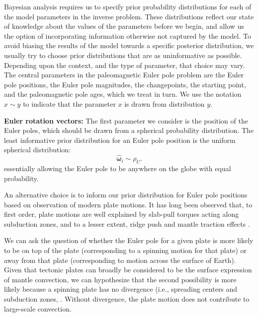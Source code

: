 \documentclass[]{agujournal2019}
\begin{document}
Bayesian analysis requires us to specify prior probability distributions for each of the model parameters in the inverse problem. These distributions reflect our state of knowledge about the values of the parameters before we begin, and allow us the option of incorporating information otherwise not captured by the model. To avoid biasing the results of the model towards a specific posterior distribution, we usually try to choose prior distributions that are as uninformative as possible. Depending upon the context, and the type of parameter, that choice may vary. The central parameters in the paleomagnetic Euler pole problem are the Euler pole positions, the Euler pole magnitudes, the changepoints, the starting point, and the paleomagnetic pole ages, which we treat in turn. We use the notation $x \sim y$ to indicate that the parameter $x$ is drawn from distribution $y$.

\textbf{Euler rotation vectors:} 
The first parameter we consider is the position of the Euler poles, which should be drawn from a spherical probability distribution. The least informative prior distribution for an Euler pole position is the uniform spherical distribution:
\begin{equation}
\hat{\mathbf{\omega}}_i \sim \rho_U.
\end{equation}
essentially allowing the Euler pole to be anywhere on the globe with equal probability.

An alternative choice is to inform our prior distribution for Euler pole positions based on observation of modern plate motions. It has long been observed that, to first order, plate motions are well explained by slab-pull torques acting along subduction zones, and to a lesser extent, ridge push and mantle traction effects \cite{Forsyth1975a, Gordon1978a, Richardson1992a}. 

We can ask the question of whether the Euler pole for a given plate is more likely to be on top of the plate (corresponding to a spinning motion for that plate) or away from that plate (corresponding to motion across the surface of Earth). Given that tectonic plates can broadly be considered to be the surface expression of mantle convection, we can hypothesize that the second possibility is more likely because a spinning plate has no divergence (i.e., spreading centers and subduction zones, \cite{Forte1987a, Gable1991a}. Without divergence, the plate motion does not contribute to large-scale convection.
\end{document}
